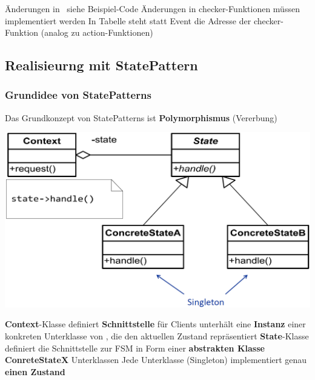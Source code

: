 
\begin{outline}
    \1 Änderungen in  \textrightarrow\ siehe Beispiel-Code
    \1 Änderungen in 
        \2 checker-Funktionen müssen implementiert werden
        \2 In Tabelle steht statt Event die Adresse der checker-Funktion (analog zu action-Funktionen)
\end{outline}





\subsection{Realisieurng mit StatePattern}

\subsubsection{Grundidee von StatePatterns}
\label{Grundidee StatePatterns}

Das Grundkonzept von StatePatterns ist \textbf{Polymorphismus} (Vererbung)

\begin{center}
    \includegraphics[width=0.7\columnwidth]{images/fsm_state_pattern_struktur.png}
\end{center}

\begin{outline}
    \1 \textbf{Context}-Klasse
        \2 definiert \textbf{Schnittstelle} für Clients
        \2 unterhält eine \textbf{Instanz} einer konkreten Unterklasse von , die den aktuellen Zustand repräsentiert
    \1 \textbf{State}-Klasse
        \2 definiert die Schnittstelle zur FSM in Form einer \textbf{abstrakten Klasse}
    \1 \textbf{ConreteStateX} Unterklassen
        \2 Jede Unterklasse (Singleton) implementiert genau \textbf{einen Zustand}
\end{outline}


